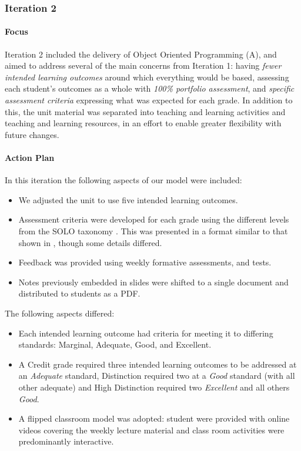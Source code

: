 \subsubsection{Iteration 2} %
\label{sub:iteration_2}

\paragraph{Focus} %

Iteration 2 included the delivery of Object Oriented Programming (A), and aimed to address several of the main concerns from Iteration 1: having \emph{fewer intended learning outcomes} around which everything would be based, assessing each student's outcomes as a whole with \emph{100\% portfolio assessment}, and \emph{specific assessment criteria} expressing what was expected for each grade. In addition to this, the unit material was separated into teaching and learning activities and teaching and learning resources, in an effort to enable greater flexibility with future changes.

\paragraph{Action Plan} %
\label{ssub:develop_an_action_plan2}

In this iteration the following aspects of our model were included:
\begin{itemize}[noitemsep,nolistsep]
  \item We adjusted the unit to use five intended learning outcomes.
  \item Assessment criteria were developed for each grade using the different levels from the SOLO taxonomy \cite{Biggs:1982}. This was presented in a format similar to that shown in , though some details differed.
  \item Feedback was provided using weekly formative assessments, and tests.
  \item Notes previously embedded in slides were shifted to a single document and distributed to students as a PDF.
\end{itemize}

The following aspects differed:
\begin{itemize}[noitemsep,nolistsep]
  \item Each intended learning outcome had criteria for meeting it to differing standards: Marginal, Adequate, Good, and Excellent.
  \item A Credit grade required three intended learning outcomes to be addressed at an \emph{Adequate} standard, Distinction required two at a \emph{Good} standard (with all other adequate) and High Distinction required two \emph{Excellent} and all others \emph{Good}.
  \item A flipped classroom model \cite{Baker:2000,Lage:2000} was adopted: student were provided with online videos covering the weekly lecture material and class room activities were predominantly interactive.
\end{itemize}

